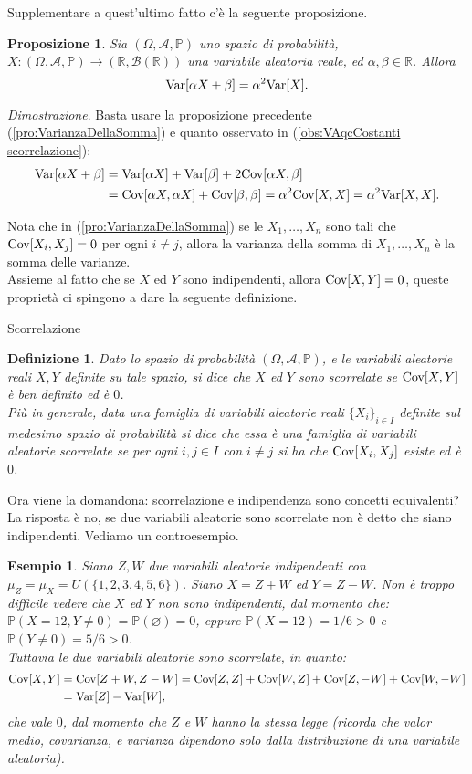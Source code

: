 \documentclass[11pt]{book}
\makeatletter
\theoremstyle{Definizione}
\newtheorem*{mydef}{Definizione}
\theoremstyle{TeoremaProposizioneLemmaCorollario}
\newtheorem{mypropo}[myteo]{Proposizione}
\theoremstyle{OsservazioneNota}
\newtheorem{myes}{Esempio}[section]
\renewenvironment{proof}[1][\proofname]{\par
  \normalfont \topsep6\p@\@plus6\p@\relax
  \trivlist
  \item[\hskip\labelsep
        \itshape
    #1\@addpunct{.}]\ignorespaces
}{%
  \endtrivlist\@endpefalse
}
\newcommand{\R}{\mathbb{R}}
\renewcommand{\P}{\mathbb{P}}
\newcommand{\Cov}{\textup{Cov}}
\newcommand{\Var}{\textup{Var}}
\renewenvironment{proof}{\textsl{Dimostrazione}.}{}
\makeatother
\begin{document}
Supplementare a quest'ultimo fatto c'è la seguente proposizione.
\begin{boxpro}
\begin{mypropo}
Sia $(\Omega,\mathcal{A},\P)$ uno spazio di probabilità, $X:(\Omega,\mathcal{A},\P)\longrightarrow (\R,\mathcal{B}(\R))$ una variabile aleatoria reale, ed $\alpha,\beta\in \R$. Allora
$$
\Var[\alpha X+\beta] = \alpha^2\Var[X].
$$
\end{mypropo}
\tcblower
\begin{proof}
Basta usare la proposizione precedente (\ref{pro:VarianzaDellaSomma}) e quanto osservato in (\ref{obs:VAqcCostanti scorrelazione}):
\begin{align*}
\Var[\alpha X+\beta] &= \Var[\alpha X] + \Var[\beta] + 2 \Cov[\alpha X,\beta]\\
&= \Cov[\alpha X, \alpha X] + \Cov[\beta,\beta] = \alpha^2 \Cov[X,X] = \alpha^2 \Var[X,X].
\end{align*}
\end{proof}
\end{boxpro}
\noindent
Nota che in (\ref{pro:VarianzaDellaSomma}) se le $X_1,\dots,X_n$ sono tali che $\Cov[X_i,X_j] = 0$ per ogni $i\neq j$, allora la varianza della somma di $X_1,\dots,X_n$ è la somma delle varianze.\\
Assieme al fatto che se $X$ ed $Y$ sono indipendenti, allora $\Cov[X,Y] = 0$, queste proprietà ci spingono a dare la seguente definizione.
\begin{boxdef}{Scorrelazione}
\begin{mydef}
Dato lo spazio di probabilità $(\Omega,\mathcal{A},\P)$, e le variabili aleatorie reali $X,Y$ definite su tale spazio, si dice che $X$ ed $Y$ sono scorrelate se $\Cov[X,Y]$ è ben definito ed è $0$.\\
Più in generale, data una famiglia di variabili aleatorie reali $\{X_i\}_{i\in I}$ definite sul medesimo spazio di probabilità si dice che essa è una famiglia di variabili aleatorie scorrelate se per ogni $i,j\in I$ con $i \neq j$ si ha che $\Cov[X_i,X_j]$ esiste ed è $0$.
\end{mydef}
\end{boxdef}
\noindent
Ora viene la domandona: scorrelazione e indipendenza sono concetti equivalenti? La risposta è no, se due variabili aleatorie sono scorrelate non è detto che siano indipendenti. Vediamo un controesempio.
\begin{myes}
Siano $Z,W$ due variabili aleatorie indipendenti con $\mu_Z = \mu_X = U(\{1,2,3,4,5,6\})$. Siano $X = Z+W$ ed $Y = Z-W$. Non è troppo difficile vedere che $X$ ed $Y$ non sono indipendenti, dal momento che:$\P(X = 12,Y \neq 0) = \P(\varnothing) = 0$, eppure $\P(X = 12) = 1/6 > 0$ e $\P(Y \neq 0) = 5/6 > 0$.\\
Tuttavia le due variabili aleatorie sono scorrelate, in quanto:
\begin{align*}
\Cov[X,Y] &= \Cov[Z+W,Z-W] = \Cov[Z,Z] + \Cov[W,Z] + \Cov[Z,-W] + \Cov[W,-W]\\
&= \Var[Z] -\Var[W],
\end{align*}
che vale $0$, dal momento che $Z$ e $W$ hanno la stessa legge (ricorda che valor medio, covarianza, e varianza dipendono solo dalla distribuzione di una variabile aleatoria).
\end{myes}
\end{document}
